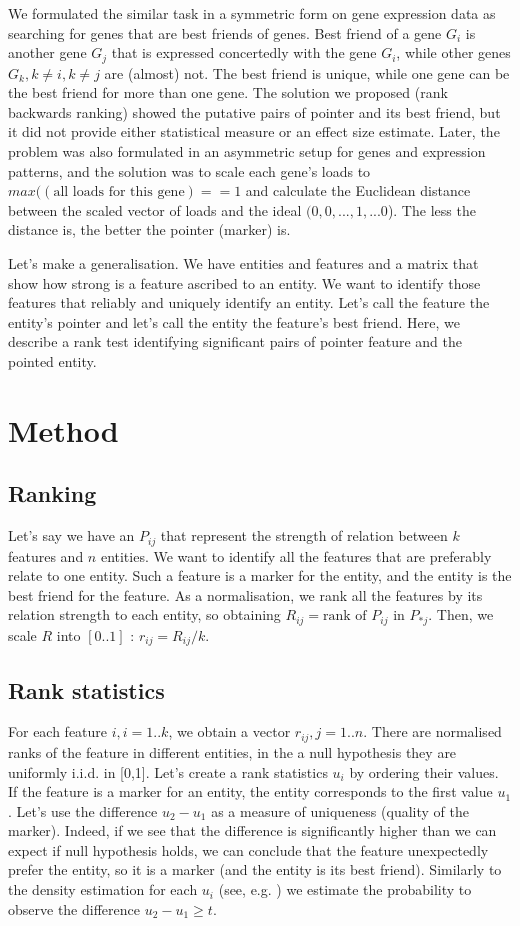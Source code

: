 \documentclass{llncs}
\begin{document}
We formulated \cite{best_friends:2015} the similar task in a symmetric form on gene expression data as searching for genes that are best friends of genes. Best friend of a gene $G_i$ is another gene $G_j$ that is expressed concertedly with the gene $G_i$, while other genes $G_k, k\neq i, k \neq j$ are (almost) not. The best friend is unique, while one gene can be the best friend for more than one gene. The solution we proposed (rank backwards ranking) showed the putative pairs of pointer and its best friend, but it did not provide either statistical measure or an effect size estimate. Later, the problem was also formulated in an asymmetric setup \cite{patternmarkers:2017} for genes and expression patterns, and the solution was to scale each gene's loads to $max((\mbox{all loads for this gene})==1$ and calculate the Euclidean distance between the scaled vector of loads and the ideal $(0,0,...,1,...0$). The less the distance is, the better the pointer (marker) is. 

Let's make a generalisation. We have entities and features and a matrix that show how strong is a feature ascribed to an entity. We want to identify those features that reliably and uniquely identify an entity. Let's call the feature the entity's pointer and let's call the entity the feature's best friend. Here, we describe a rank test identifying significant pairs of pointer feature and the pointed entity.
%
\section{Method}
\subsection{Ranking}
Let's say we have an $P_{ij}$ that represent the strength of relation between $k$ features and $n$ entities. We want to identify all the features that are preferably relate to one entity. Such a feature is a marker for the entity, and the entity is the best friend for the feature.
As a normalisation, we rank all the features by its relation strength to each entity, so obtaining $R_{ij}= \textrm{rank of } P_{ij} \textrm{ in } P_{*j}$. Then, we scale $R$ into $[0..1]$ : $r_{ij}={R_{ij}}/{k}$.

\subsection{Rank statistics}
For each feature $i,i=1..k$, we obtain a vector $r_{ij}, j=1..n$. There are normalised ranks of the feature in different entities, in the a null hypothesis they are uniformly i.i.d. in [0,1]. Let's create a rank statistics $u_i$ by ordering their values. If the feature is a marker for an entity, the entity corresponds to the first value $u_1$. Let's use the difference $u_2-u_1$ as a measure of uniqueness (quality of the marker). Indeed, if we see that the difference is significantly higher than we can expect if null hypothesis holds, we can conclude that the feature unexpectedly prefer the entity, so it is a marker (and the entity is its best friend). Similarly to the density estimation for each $u_i$ (see, e.g. \cite{Gut:2009}) we estimate the probability to observe the difference $u_2 - u_1 \ge t$. 
\end{document}
